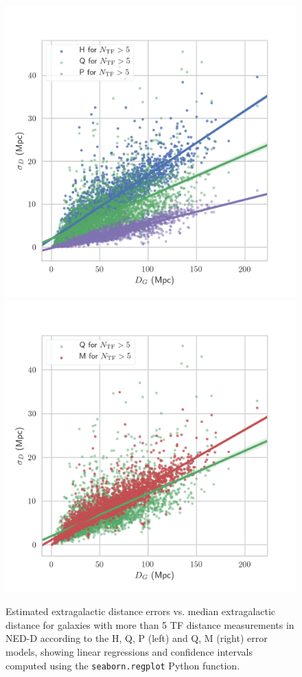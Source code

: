 \documentclass[a4paper,fleqn,usenatbib]{mnras}
\begin{document}
\begin{figure}

	\includegraphics[scale=0.69]{f04hqp.png}
	\includegraphics[scale=0.69]{f05qm.png}
    \caption{Estimated extragalactic distance errors vs. median extragalactic distance  for galaxies with more than 5 TF distance measurements in NED-D according to the H, Q, P (left) and Q, M (right) error models, showing linear regressions and confidence intervals computed using the \texttt{seaborn.regplot} Python function.}
    \label{fig:hqp-qm}
\end{figure}
\end{document}
